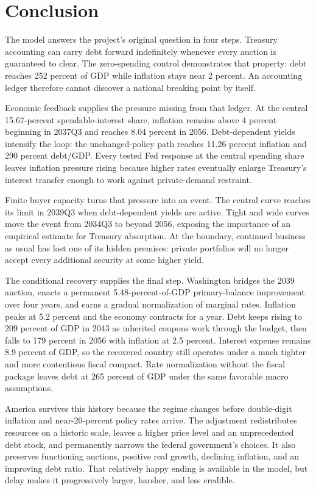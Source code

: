 \documentclass[11pt]{article}
\begin{document}
\section{Conclusion}

The model answers the project's original question in four steps.  Treasury accounting can
carry debt forward indefinitely whenever every auction is guaranteed to clear.  The
zero-spending control demonstrates that property: debt reaches 252 percent of GDP while
inflation stays near 2 percent.  An accounting ledger therefore cannot discover a national
breaking point by itself.

Economic feedback supplies the pressure missing from that ledger.  At the central
15.67-percent spendable-interest share, inflation remains above 4 percent beginning in
2037Q3 and reaches 8.04 percent in 2056.  Debt-dependent yields intensify the loop: the
unchanged-policy path reaches 11.26 percent inflation and 290 percent debt/GDP.  Every tested
Fed response at the central spending share leaves inflation pressure rising because higher
rates eventually enlarge Treasury's interest transfer enough to work against private-demand
restraint.

Finite buyer capacity turns that pressure into an event.  The central curve reaches its
limit in 2039Q3 when debt-dependent yields are active.  Tight and wide curves move the event
from 2034Q3 to beyond 2056, exposing the importance of an empirical estimate for Treasury
absorption.  At the boundary, continued business as usual has lost one of its hidden
premises: private portfolios will no longer accept every additional security at some higher
yield.

The conditional recovery supplies the final step.  Washington bridges the 2039 auction,
enacts a permanent 5.48-percent-of-GDP primary-balance improvement over four years, and earns
a gradual normalization of marginal rates.  Inflation peaks at 5.2 percent and the economy
contracts for a year.  Debt keeps rising to 209 percent of GDP in 2043 as inherited coupons
work through the budget, then falls to 179 percent in 2056 with inflation at 2.5 percent.
Interest expense remains 8.9 percent of GDP, so the recovered country still operates under a
much tighter and more contentious fiscal compact.  Rate normalization without the fiscal
package leaves debt at 265 percent of GDP under the same favorable macro assumptions.

America survives this history because the regime changes before double-digit inflation and
near-20-percent policy rates arrive.  The adjustment redistributes resources on a historic
scale, leaves a higher price level and an unprecedented debt stock, and permanently narrows
the federal government's choices.  It also preserves functioning auctions, positive real
growth, declining inflation, and an improving debt ratio.  That relatively happy ending is
available in the model, but delay makes it progressively larger, harsher, and less credible.
\end{document}
